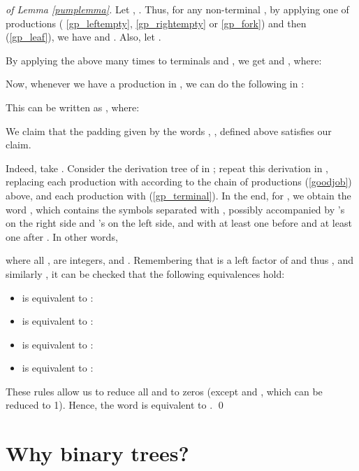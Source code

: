 \documentclass{article}
\begin{document}
\begin{proof}[of Lemma \ref{pumplemma}]

\def\ob{\heartsuit}
\def\cb{{\overbar{\heartsuit}}}
Let , . Thus, for any 
non-terminal , by applying one of productions (
\ref{gp_leftempty}, \ref{gp_rightempty} or \ref{gp_fork}) and then 
(\ref{gp_leaf}), we have  and 
. Also, let .

By applying the above many times to terminals  and , we get
 and , where:



Now, whenever we have a production  in , we can do the following in :


This can be written as , where:



We claim that the padding  given by the words , ,  defined above
satisfies our claim.

Indeed, take . Consider the derivation tree of  in ;
repeat this derivation in , replacing each production  with
 according to
the chain of productions (\ref{goodjob}) above, and each production  with 
(\ref{gp_terminal}).
In the end, for , we obtain the word , which
contains the symbols  separated with , possibly accompanied
by 's on the right side and 's on the left side, and with at least one
 before  and at least one  after . In other words,



where all ,  are integers, and .
Remembering that  is a left factor of  and thus , and similarly ,
it can be checked that the following equivalences hold:

\begin{itemize}
\item  is equivalent to :


\item  is equivalent to :


\item  is equivalent to :


\item  is equivalent to :

\end{itemize}

These rules allow us to reduce all  and  to zeros (except  and ,
which can be reduced to 1). Hence, the word  is equivalent to . \qed
\end{proof}

\section{Why binary trees?}
\end{document}
